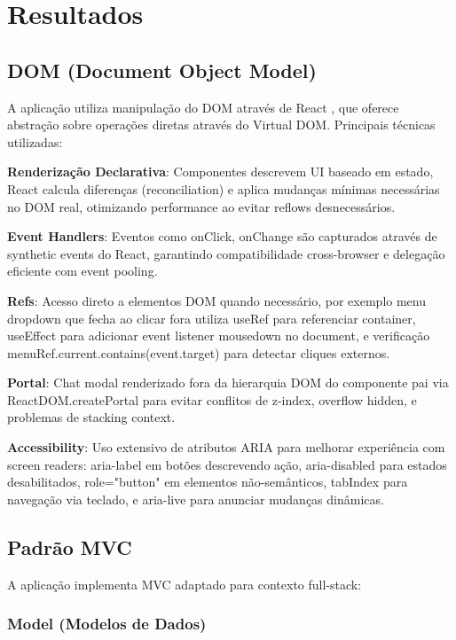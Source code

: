 \documentclass[conference]{IEEEtran}
\begin{document}
\section{Resultados}

\subsection{DOM (Document Object Model)}

A aplicação utiliza manipulação do DOM através de React \cite{react:2024}, que oferece abstração sobre operações diretas através do Virtual DOM. Principais técnicas utilizadas:

\textbf{Renderização Declarativa}: Componentes descrevem UI baseado em estado, React calcula diferenças (reconciliation) e aplica mudanças mínimas necessárias no DOM real, otimizando performance ao evitar reflows desnecessários.

\textbf{Event Handlers}: Eventos como onClick, onChange são capturados através de synthetic events do React, garantindo compatibilidade cross-browser e delegação eficiente com event pooling.

\textbf{Refs}: Acesso direto a elementos DOM quando necessário, por exemplo menu dropdown que fecha ao clicar fora utiliza useRef para referenciar container, useEffect para adicionar event listener mousedown no document, e verificação menuRef.current.contains(event.target) para detectar cliques externos.

\textbf{Portal}: Chat modal renderizado fora da hierarquia DOM do componente pai via ReactDOM.createPortal para evitar conflitos de z-index, overflow hidden, e problemas de stacking context.

\textbf{Accessibility}: Uso extensivo de atributos ARIA para melhorar experiência com screen readers: aria-label em botões descrevendo ação, aria-disabled para estados desabilitados, role="button" em elementos não-semânticos, tabIndex para navegação via teclado, e aria-live para anunciar mudanças dinâmicas.

\subsection{Padrão MVC}

A aplicação implementa MVC adaptado para contexto full-stack:

\subsubsection{Model (Modelos de Dados)}
\end{document}
